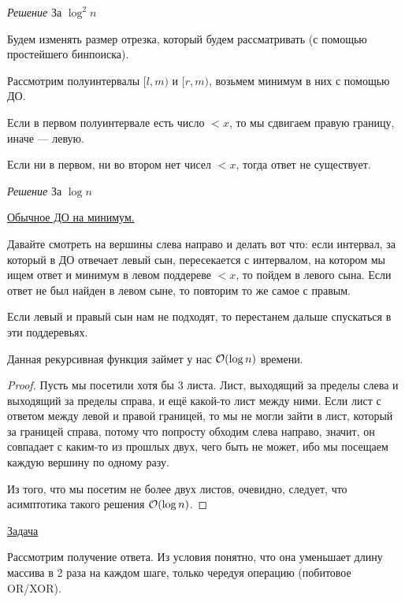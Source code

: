 
{\it Решение } За $\log^2 n$

Будем изменять размер отрезка, который будем рассматривать (с помощью простейшего бинпоиска).

Рассмотрим полуинтервалы $[l, m)$ и $[r, m)$, возьмем минимум в них с помощью ДО.

Если в первом полуинтервале есть число $< x$, то мы сдвигаем правую границу, иначе --- левую.

Если ни в первом, ни во втором нет чисел $< x$, тогда ответ не существует.

\down

{\it Решение } За $\log n$

\href{https://codeforces.com/blog/entry/70625}{Обычное ДО на минимум.}

Давайте смотреть на вершины слева направо и делать вот что: если интервал, за который в ДО отвечает левый сын, пересекается с интервалом, на котором мы ищем ответ и минимум в левом поддереве $<x$, то пойдем в левого сына. Если ответ не был найден в левом сыне, то повторим то же самое с правым.

Если левый и правый сын нам не подходят, то перестанем дальше спускаться в эти поддеревьях.

\begin{Thm}\label{thm@splay}
Данная рекурсивная функция займет у нас $\mathcal{O}(\log n)$ времени.
\end{Thm}

\begin{proof}
Пусть мы посетили хотя бы 3 листа. Лист, выходящий за пределы слева и выходящий за пределы справа, и ещё какой-то лист между ними. Если лист с ответом между левой и правой границей, то мы не могли зайти в лист, который за границей справа, потому что попросту обходим слева направо, значит, он совпадает с каким-то из прошлых двух, чего быть не может, ибо мы посещаем каждую вершину по одному разу.

Из того, что мы посетим не более двух листов, очевидно, следует, что асимптотика такого решения $\mathcal{O}(\log n)$.
\end{proof}



\href{https://codeforces.com/contest/339/problem/D}{Задача}
\href{https://codeforces.com/contest/339/submission/105829607}{}

Рассмотрим получение ответа. Из условия понятно, что она уменьшает длину массива в 2 раза на каждом шаге, только чередуя операцию (побитовое OR/XOR). 

